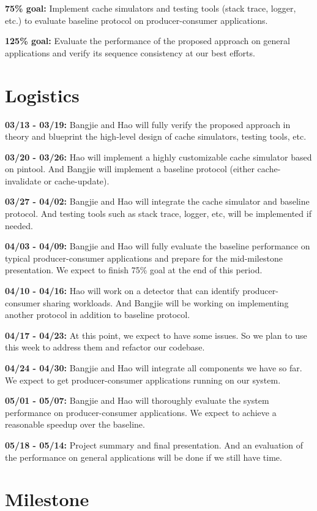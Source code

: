\documentclass{article} %
\begin{document}
\textbf{75\% goal:} Implement cache simulators and testing tools (stack trace, logger, etc.) to evaluate baseline protocol on producer-consumer applications.

\textbf{125\% goal:} Evaluate the performance of the proposed approach on general applications and verify its sequence consistency at our best efforts.


\section{Logistics}

\textbf{03/13 - 03/19:} Bangjie and Hao will fully verify the proposed approach in theory and blueprint the high-level design of cache simulators, testing tools, etc.

\textbf{03/20 - 03/26:} Hao will implement a highly customizable cache simulator based on pintool. And Bangjie will implement a baseline protocol (either cache-invalidate or cache-update).

\textbf{03/27 - 04/02:} Bangjie and Hao will integrate the cache simulator and baseline protocol. And testing tools such as stack trace, logger, etc, will be implemented if needed.

\textbf{04/03 - 04/09:} Bangjie and Hao will fully evaluate the baseline performance on typical producer-consumer applications and prepare for the mid-milestone presentation. We expect to finish 75\% goal at the end of this period.

\textbf{04/10 - 04/16:} Hao will work on a detector that can identify producer-consumer sharing workloads. And Bangjie will be working on implementing another protocol in addition to baseline protocol.

\textbf{04/17 - 04/23:} At this point, we expect to have some issues. So we plan to use this week to address them and refactor our codebase.

\textbf{04/24 - 04/30:} Bangjie and Hao will integrate all components we have so far. We expect to get producer-consumer applications running on our system.

\textbf{05/01 - 05/07:} Bangjie and Hao will thoroughly evaluate the system performance on producer-consumer applications. We expect to achieve a reasonable speedup over the baseline.

\textbf{05/18 - 05/14:} Project summary and final presentation. And an evaluation of the performance on general applications will be done if we still have time.


\section{Milestone}
\end{document}
